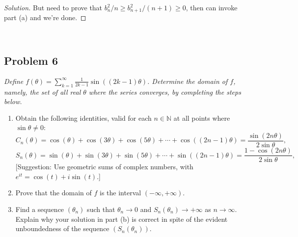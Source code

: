 \documentclass{article}
\newcommand{\N}{{\mathbb N}}
\begin{document}
{{\begin{enumerate}
\begin{proof}[Solution]
		But need to prove that $b_n^2/n \geq b_{n+1}^2/(n+1) \geq 0$,
		then can invoke part (a) and we're done.
	\end{proof}
\end{enumerate} 
\clearpage
~\clearpage

\subsection*{Problem 6}
{\it Define $f(\theta) = \sum_{k=1}^\infty \frac{1}{2k-1}\sin((2k-1)\theta)$.
Determine the domain of $f$, namely,
the set of all real $\theta$ where the series converges,
by completing the steps below.
\begin{enumerate}
	\item Obtain the following identities, valid for each $n \in \N$
		at all points where $\sin\theta \neq 0$:
		\[
			C_n(\theta) = \cos(\theta) + \cos(3\theta) + \cos(5\theta)
			+ \cdots + \cos((2n-1)\theta) = \frac{\sin(2n\theta)}{2\sin\theta},
		\]
		\[
			S_n(\theta) = \sin(\theta) + \sin(3\theta) + \sin(5\theta)
			+ \cdots + \sin((2n-1)\theta) = \frac{1-\cos(2n\theta)}{2\sin\theta},
		\]
		[Suggestion: Use geometric sums of complex numbers,
		with $e^{it} = \cos(t) + i\sin(t)$.]
	\item Prove that the domain of $f$ is the interval $(-\infty,+\infty)$.
	\item Find a sequence $(\theta_n)$ such that $\theta_n \to 0$
		and $S_n(\theta_n) \to +\infty$ as $n \to \infty$.
		Explain why your solution in part (b) is correct in spite
		of the evident unboundedness of the sequence $(S_n(\theta_n))$.
\end{enumerate}
}

}}
\end{document}

